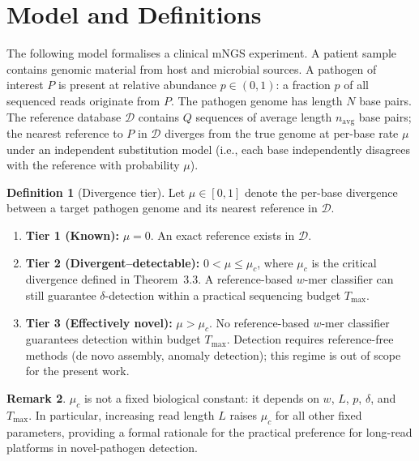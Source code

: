 \documentclass[12pt]{article}
\theoremstyle{definition}
\newtheorem{definition}{Definition}[section]
\newtheorem{remark}[definition]{Remark}
\theoremstyle{plain}
\begin{document}
\section{Model and Definitions}

The following model formalises a clinical mNGS experiment. A patient sample
contains genomic material from host and microbial sources. A pathogen of
interest $P$ is present at relative abundance $p\in(0,1)$: a fraction $p$ of
all sequenced reads originate from $P$. The pathogen genome has length $N$
base pairs. The reference database $\mathcal{D}$ contains $Q$ sequences of
average length $n_{\mathrm{avg}}$ base pairs; the nearest reference to $P$
in $\mathcal{D}$ diverges from the true genome at per-base rate $\mu$ under
an independent substitution model (i.e., each base independently disagrees
with the reference with probability $\mu$).

\begin{definition}[Divergence tier]\label{def:tier}
Let $\mu\in[0,1]$ denote the per-base divergence between a target pathogen
genome and its nearest reference in $\mathcal{D}$.
\begin{enumerate}
  \item \textbf{Tier 1 (Known):} $\mu=0$. An exact reference exists in
  $\mathcal{D}$.
  \item \textbf{Tier 2 (Divergent--detectable):} $0<\mu\le\mu_c$, where
  $\mu_c$ is the critical divergence defined in Theorem~3.3. A
  reference-based $w$-mer classifier can still guarantee $\delta$-detection
  within a practical sequencing budget $T_{\max}$.
  \item \textbf{Tier 3 (Effectively novel):} $\mu>\mu_c$. No
  reference-based $w$-mer classifier guarantees detection within budget
  $T_{\max}$. Detection requires reference-free methods (de novo assembly,
  anomaly detection); this regime is out of scope for the present work.
\end{enumerate}
\end{definition}

\begin{remark}\label{rem:muc-dep}
$\mu_c$ is not a fixed biological constant: it depends on $w$, $L$, $p$,
$\delta$, and $T_{\max}$. In particular, increasing read length $L$ raises
$\mu_c$ for all other fixed parameters, providing a formal rationale for the
practical preference for long-read platforms in novel-pathogen detection.
\end{remark}
\end{document}
